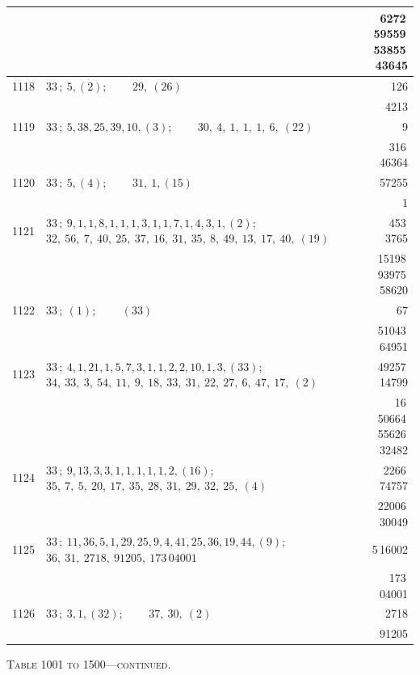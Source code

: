 \documentclass[11pt]{article}
\begin{document}
\begin{longtable}{|r|p{}|r|}
 & & 6272\,59559\,53855\,43645 \\
\hline
1118 & $33\,;\ 5, (2)$; \ \ \ \ $29,\ (26)$ & 126 \\
 & & 4213 \\
\hline
1119 & $33\,;\ 5, 38, 25, 39, 10, (3)$; \ \ \ \ $30,\ 4,\ 1,\ 1,\ 1,\ 6,\ (22)$ & 9 \\
 & & 316\,46364 \\
\hline
1120 & $33\,;\ 5, (4)$; \ \ \ \ $31,\ 1, (15)$ & 57255 \\
 & & 1 \\
\hline
1121 & $33\,;\ 9, 1, 1, 8, 1, 1, 1, 3, 1, 1, 7, 1, 4, 3, 1, (2)$; \ \ \ \ $32,\ 56,\ 7,\ 40,\ 25,\ 37,\ 16,\ 31,\ 35,\ 8,\ 49,\ 13,\ 17,\ 40,\ (19)$ & 453\,3765 \\
 & & 15198\,93975\,58620 \\
\hline
1122 & $33\,;\ (1)$; \ \ \ \ $(33)$ & 67 \\
 & & 51043\,64951 \\
\hline
1123 & $33\,;\ 4, 1, 21, 1, 5, 7, 3, 1, 1, 2, 2, 10, 1, 3, (33)$; \ \ \ \ $34,\ 33,\ 3,\ 54,\ 11,\ 9,\ 18,\ 33,\ 31,\ 22,\ 27,\ 6,\ 47,\ 17,\ (2)$ & 49257\,14799 \\
 & & 16\,50664\,55626\,32482 \\
\hline
1124 & $33\,;\ 9, 13, 3, 3, 1, 1, 1, 1, 1, 2, (16)$; \ \ \ \ $35,\ 7,\ 5,\ 20,\ 17,\ 35,\ 28,\ 31,\ 29,\ 32,\ 25,\ (4)$ & 2266\,74757 \\
 & & 22006\,30049 \\
\hline
1125 & $33\,;\ 11, 36, 5, 1, 29, 25, 9, 4, 41, 25, 36, 19, 44, (9)$; \ \ \ \ $36,\ 31,\ 2718,\ 91205,\ 173\,04001$ & 5\,16002 \\
 & & 173\,04001 \\
\hline
1126 & $33\,;\ 3, 1, (32)$; \ \ \ \ $37,\ 30,\ (2)$ & 2718 \\
 & & 91205 \\
\hline
\end{longtable}

\begin{center}
\small\textsc{Table 1001 to 1500---continued.}
\end{center}
\end{document}
